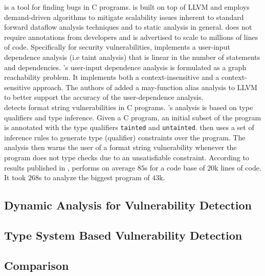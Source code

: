 \parfait\cite{Parfait:2008} is a tool for finding bugs in
C programs. \parfait is built on top of LLVM and employs
demand-driven algorithms to mitigate scalability issues
inherent to standard forward dataflow analysis techniques
and to static analysis in general.	
\parfait does not require annotations from developers and
is advertised to scale to millions of lines of code. 
Specifically for security vulnerabilities, \parfait implements
a user-input dependence analysis\cite{Scholz:2008:UDA} (i.e taint analysis) that
is linear in the number of statements and dependencies. \parfait's
user-input dependence analysis is formulated as a graph
reachability problem. It implements both a context-insensitive and
a context-sensitive approach. The authors of \parfait added 
a may-function alias analysis to LLVM to better support
the accuracy of the user-dependence analysis.\\

\cqual\cite{Shankar:2001:DFS} detects format string vulnerabilities
in C programs. \cqual's analysis is based on type
qualifiers\cite{Foster:1999:TTQ} and type inference. Given a C program,
an initial subset of the program is annotated with the type qualifiers
\texttt{tainted} and \texttt{untainted}. \cqual then uses a set of
inference rules to generate type (qualifier) constraints over the program.
The analysis then warns the user of a format string vulnerability
whenever the program does not type checks due to an unsatisfiable
constraint. According to results published in \cite{Shankar:2001:DFS},
\cqual performs on average $85$s for a code base of $20$k lines of code.
It took $268$s to analyze the biggest program of $43$k.

\subsection{Dynamic Analysis for Vulnerability Detection}

\subsection{Type System Based Vulnerability Detection}

\subsection{Comparison}

